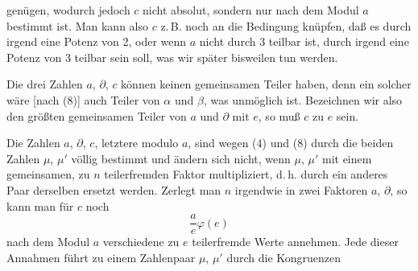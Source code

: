 
genügen, wodurch jedoch $c$ nicht absolut, sondern nur nach dem Modul $a$
bestimmt ist. Man kann also $c$ z.\,B. noch an die Bedingung knüpfen, daß es
durch irgend eine Potenz von 2, oder wenn $a$ nicht durch 3 teilbar ist,
durch irgend eine Potenz von 3 teilbar sein soll, was wir später bisweilen
tun werden.

Die drei Zahlen $a$, $\partial$, $c$ können keinen gemeinsamen Teiler haben,
denn ein solcher wäre [nach (8)] auch Teiler von $\alpha$ und $\beta$, was
unmöglich ist. Bezeichnen wir also den größten gemeinsamen Teiler von $a$
und $\partial$ mit $e$, so muß $c$  zu $e$ sein.

Die Zahlen $a$, $\partial$, $c$, letztere modulo $a$, sind wegen (4) und (8)
durch die beiden Zahlen $\mu$, $\mu'$ völlig bestimmt und ändern sich nicht,
wenn $\mu$, $\mu'$ mit einem gemeinsamen, zu $n$ teilerfremden Faktor
multipliziert, d.\,h. durch ein anderes Paar derselben  ersetzt werden.
Zerlegt man $n$ irgendwie in zwei Faktoren $a$, $\partial$, so kann man für
$c$ noch
\[
\frac{a}{e}\varphi(e)
\]
nach dem Modul $a$ verschiedene zu $e$ teilerfremde Werte annehmen. Jede
dieser Annahmen führt zu einem Zahlenpaar $\mu$, $\mu'$ durch die
Kongruenzen
